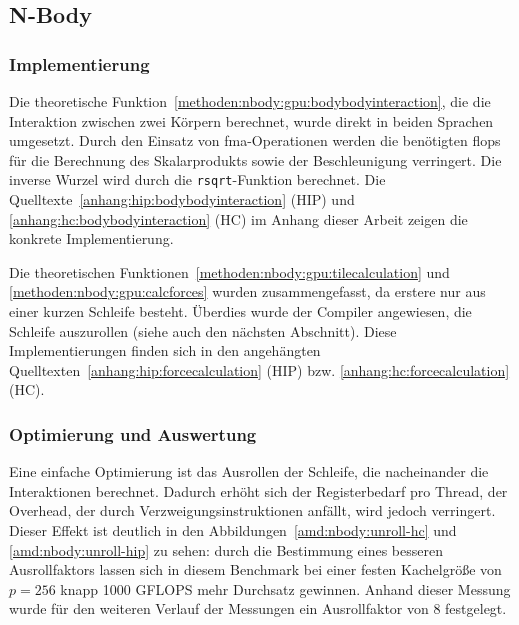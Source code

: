 \subsection{N-Body}

\subsubsection{Implementierung}

Die theoretische Funktion~\ref{methoden:nbody:gpu:bodybodyinteraction}, die die
Interaktion zwischen zwei Körpern berechnet, wurde direkt in beiden Sprachen
umgesetzt. Durch den Einsatz von \gls{fma}-Operationen werden die benötigten
\gls{flops} für die Berechnung des Skalarprodukts sowie der Beschleunigung
verringert. Die inverse Wurzel wird durch die \texttt{rsqrt}-Funktion berechnet.
Die Quelltexte~\ref{anhang:hip:bodybodyinteraction} (HIP) und
\ref{anhang:hc:bodybodyinteraction} (HC) im Anhang dieser Arbeit zeigen die
konkrete Implementierung.

Die theoretischen Funktionen~\ref{methoden:nbody:gpu:tilecalculation} und
\ref{methoden:nbody:gpu:calcforces} wurden zusammengefasst, da erstere
nur aus einer kurzen Schleife besteht. Überdies wurde der Compiler angewiesen,
die Schleife auszurollen (siehe auch den nächsten Abschnitt). Diese
Implementierungen finden sich in den angehängten
Quelltexten~\ref{anhang:hip:forcecalculation} (HIP) bzw.
\ref{anhang:hc:forcecalculation} (HC).

\subsubsection{Optimierung und Auswertung}

Eine einfache Optimierung ist das Ausrollen der Schleife, die nacheinander die
Interaktionen berechnet. Dadurch erhöht sich der Registerbedarf pro Thread, der
Overhead, der durch Verzweigungsinstruktionen anfällt, wird jedoch verringert.
Dieser Effekt ist deutlich in den Abbildungen~\ref{amd:nbody:unroll-hc} und
\ref{amd:nbody:unroll-hip} zu sehen:  durch die Bestimmung eines besseren
Ausrollfaktors lassen sich in diesem Benchmark bei einer festen Kachelgröße von
$p = 256$ knapp \num{1000} GFLOPS mehr Durchsatz gewinnen. Anhand dieser Messung
wurde für den weiteren Verlauf der Messungen ein Ausrollfaktor von 8 festgelegt.

